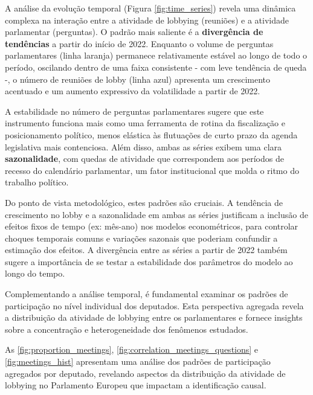 A análise da evolução temporal (Figura \ref{fig:time_series}) revela uma dinâmica complexa na interação entre a atividade de lobbying (reuniões) e a atividade parlamentar (perguntas). O padrão mais saliente é a \textbf{divergência de tendências} a partir do início de 2022. Enquanto o volume de perguntas parlamentares (linha laranja) permanece relativamente estável ao longo de todo o período, oscilando dentro de uma faixa consistente - com leve tendência de queda -, o número de reuniões de lobby (linha azul) apresenta um crescimento acentuado e um aumento expressivo da volatilidade a partir de 2022.

A estabilidade no número de perguntas parlamentares sugere que este instrumento funciona mais como uma ferramenta de rotina da fiscalização e posicionamento político, menos elástica às flutuações de curto prazo da agenda legislativa mais contenciosa. Além disso, ambas as séries exibem uma clara \textbf{sazonalidade}, com quedas de atividade que correspondem aos períodos de recesso do calendário parlamentar, um fator institucional que molda o ritmo do trabalho político.

Do ponto de vista metodológico, estes padrões são cruciais. A tendência de crescimento no lobby e a sazonalidade em ambas as séries justificam a inclusão de efeitos fixos de tempo (ex: mês-ano) nos modelos econométricos, para controlar choques temporais comuns e variações sazonais que poderiam confundir a estimação dos efeitos. A divergência entre as séries a partir de 2022 também sugere a importância de se testar a estabilidade dos parâmetros do modelo ao longo do tempo.



Complementando a análise temporal, é fundamental examinar os padrões de participação no nível individual dos deputados. Esta perspectiva agregada revela a distribuição da atividade de lobbying entre os parlamentares e fornece insights sobre a concentração e heterogeneidade dos fenômenos estudados.



As \autoref{fig:proportion_meetings}, \autoref{fig:correlation_meetings_questions} e \autoref{fig:meetings_hist} apresentam uma análise dos padrões de participação agregados por deputado, revelando aspectos da distribuição da atividade de lobbying no Parlamento Europeu que impactam a identificação causal.


